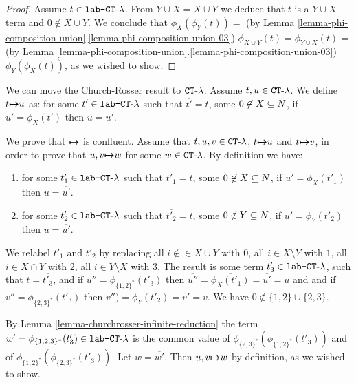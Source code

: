\begin{proof}
Assume $t \in {\mbox{\tt lab-} { {\tt CT}\mbox{-}\lambda} }$.
From $Y \cup X = X \cup Y$ we deduce that $t$ is a $Y \cup X$-term and $0 \not \in X \cup Y$.
We conclude that
$\phi_{X}(\phi_{Y}(t)) = 
$ (by Lemma \ref{lemma-phi-composition-union}.\ref{lemma-phi-composition-union-03}) $
\phi_{X \cup Y}(t) = 
\phi_{Y \cup X}(t) = 
$ (by Lemma \ref{lemma-phi-composition-union}.\ref{lemma-phi-composition-union-03}) $
\phi_{Y}(\phi_{X}(t))
$, 
as we wished to show.
\end{proof}


We can move the Church-Rosser result to ${ {\tt CT}\mbox{-}\lambda}$. Assume $t, u \in { {\tt CT}\mbox{-}\lambda}$.
We define $t { \mapsto \mspace{-17mu} \mapsto } u$ as: for some $t' \in {\mbox{\tt lab-} { {\tt CT}\mbox{-}\lambda} }$
such that $\overline{t'} = t$, some $0 \not \in X \subseteq {N}$, if $u' = \phi_X(t')$
then $u = \overline{u'}$.


We prove that ${ \mapsto \mspace{-17mu} \mapsto }$ is confluent. 
Assume that $t, u, v \in { {\tt CT}\mbox{-}\lambda}$,  $t { \mapsto \mspace{-17mu} \mapsto } u$ and
$t { \mapsto \mspace{-17mu} \mapsto } v$, in order to prove that  $u,v { \mapsto \mspace{-17mu} \mapsto } w$ for some $w \in { {\tt CT}\mbox{-}\lambda}$.
By definition we have:

\begin{enumerate}
\item
for some $t'_1 \in {\mbox{\tt lab-} { {\tt CT}\mbox{-}\lambda} }$
such that $\overline{t'_1} = t$, some $0 \not \in X \subseteq {N}$, if $u' = \phi_X(t'_1)$
then $u = \overline{u'}$.

\item
for some $t'_2 \in {\mbox{\tt lab-} { {\tt CT}\mbox{-}\lambda} }$
such that $\overline{t'_2} = t$, some $0 \not \in Y \subseteq {N}$, if $u' = \phi_Y(t'_2)$
then $u = \overline{u'}$.

\end{enumerate}
We relabel $t'_1$ and $t'_2$ by replacing 
all $i  \not \in \in X \cup Y$ with $0$, 
all $i \in X \setminus Y$ with $1$, 
all $i \in X \cap Y$ with $2$, 
all $i \in Y \setminus X$ with $3$. 
The result is some term $t'_3 \in {\mbox{\tt lab-} { {\tt CT}\mbox{-}\lambda} }$, such that 
$t = \overline{t'_3}$, and if $u''=\phi_{\{1,2\}^*}(t'_3)$
then $\overline{u''} =  \overline{\phi_{X}(t'_1)} = \overline{u'} = u$
and and if $v''=\phi_{\{2,3\}^*}(t'_3)$
then $\overline{v'')} = 
\overline{\phi_{Y}(t'_2)} =\overline{v'} = v$.
We have $0 \not \in \{1,2\} \cup \{2,3\}$.

By Lemma \ref{lemma-churchrosser-infinite-reduction}
the term $w' = \phi_{\{1,2,3\}^*}(t'_3) \in {\mbox{\tt lab-} { {\tt CT}\mbox{-}\lambda} }$ is the common value of
$\phi_{\{2,3\}^*}(\phi_{\{1,2\}^*}(t'_3))$ and of $\phi_{\{1,2\}^*}(\phi_{\{2,3\}^*}(t'_3))$. 
Let $w = \overline{w'}$. Then $u,v { \mapsto \mspace{-17mu} \mapsto } w$ by definition, as we wished to show.

